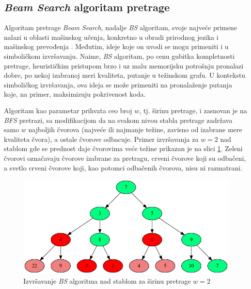 \documentclass[a4paper]{article}
\begin{document}
\subsection{\textit{Beam Search} algoritam pretrage}

Algoritam pretrage \textit{Beam Search}, nadalje \textit{BS} algoritam, svoje najveće primene nalazi u oblasti mašinskog učenja, konkretno u obradi prirodnog jezika i mašinskog prevođenja \cite{HarpySpeechRecognitionSystem, BeamSearchStrategiesForNeuralMachineTranslation, BestFirstBeamSearch}. Međutim, ideje koje on uvodi se mogu primeniti i u simboličkom izvršavanju. Naime, \textit{BS} algoritam, po cenu gubitka kompletnosti pretrage, heurističkim pristupom brzo i uz malu memorijsku potrošnju pronalazi dobre, po nekoj izabranoj meri kvaliteta, putanje u težinskom grafu. U kontekstu simboličkog izvršavanja, ova ideja se može primeniti na pronalaženje putanja koje, na primer, maksimizuju pokrivenost koda.

Algoritam kao parametar prihvata ceo broj $w$, tj. širinu pretrage, i zasnovan je na \textit{BFS} pretrazi, sa modifikacijom da na svakom nivou stabla pretrage zadržava samo $w$ najboljih čvorova (najveće ili najmanje težine, zavisno od izabrane mere kvaliteta čvora), a ostale čvorove odbacuje. Primer izvršavanja za $w = 2$ nad stablom gde se prednost daje čvorovima veće težine prikazan je na slici \ref{fig:beam_search}. Zeleni čvorovi označavaju čvorove izabrane za pretragu, crveni čvorove koji su odbačeni, a svetlo crveni čvorove koji, kao potomci odbačenih čvorova, nisu ni razmatrani.

\begin{figure}[h!]
    \centering
    \includegraphics[width=\linewidth]{ilustracije/beam_search_primer.png}
    \caption{Izvršavanje \textit{BS} algoritma nad stablom za širinu pretrage $w = 2$}
    \label{fig:beam_search}
\end{figure}
\end{document}
